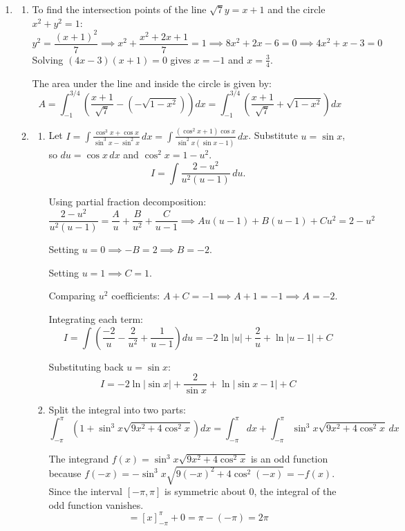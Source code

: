 \documentclass[a4paper, 12pt]{article}
\begin{document}
\begin{enumerate}[leftmargin=*,label=\textbf{\arabic*.}]
\item \begin{enumerate}[leftmargin=*,label=\textbf{\alph*.}]

\item To find the intersection points of the line $\sqrt{7}y = x+1$ and the circle $x^2 + y^2 = 1$:
\[y^2 = \frac{(x+1)^2}{7} \implies x^2 + \frac{x^2 + 2x + 1}{7} = 1 \implies 8x^2 + 2x - 6 = 0 \implies 4x^2 + x - 3 = 0\]
Solving $(4x-3)(x+1) = 0$ gives $x = -1$ and $x = \frac{3}{4}$.

The area under the line and inside the circle is given by:
\[A = \int_{-1}^{3/4} \left( \frac{x+1}{\sqrt{7}} - \left(-\sqrt{1-x^2}\right) \right) dx =\boxed{ \int_{-1}^{3/4} \left( \frac{x+1}{\sqrt{7}} + \sqrt{1-x^2} \right) dx}\]

\item \begin{enumerate}[leftmargin=*,label=\textbf{\roman*.}]
\item Let $I = \int \frac{\cos^3 x + \cos x}{\sin^3 x - \sin^2 x} \, dx = \int \frac{(\cos^2 x + 1)\cos x}{\sin^2 x (\sin x - 1)} \, dx$. Substitute $u = \sin x$, so \linebreak$du = \cos x \, dx$ and $\cos^2 x = 1 - u^2$.
\[I = \int \frac{2 - u^2}{u^2(u-1)} \, du.\]

Using partial fraction decomposition:
\[\frac{2 - u^2}{u^2(u-1)} = \frac{A}{u} + \frac{B}{u^2} + \frac{C}{u-1} \implies A u (u-1) + B(u-1) + C u^2 = 2 - u^2\]

Setting $u = 0 \implies -B = 2 \implies B = -2$.

Setting $u = 1 \implies C = 1$.

Comparing $u^2$ coefficients: $A + C = -1 \implies A + 1 = -1 \implies A = -2$.

Integrating each term:
\[I = \int \left( \frac{-2}{u} - \frac{2}{u^2} + \frac{1}{u-1} \right) du = -2\ln|u| + \frac{2}{u} + \ln|u-1| + C\]

Substituting back $u = \sin x$:
\[\boxed{I = -2\ln\left|\sin x\right| + \frac{2}{\sin x} + \ln\left|\sin x - 1\right| + C}\]

\item Split the integral into two parts:
\[\int_{-\pi}^{\pi} \left(1 + \sin^3 x \sqrt{9x^2 + 4\cos^2 x}\right) dx = \int_{-\pi}^{\pi} dx + \int_{-\pi}^{\pi} \sin^3 x \sqrt{9x^2 + 4\cos^2 x} \, dx\]

The integrand $f(x) = \sin^3 x \sqrt{9x^2 + 4\cos^2 x}$ is an odd function because \linebreak$f(-x) = -\sin^3 x \sqrt{9(-x)^2 + 4\cos^2(-x)} = -f(x)$. Since the interval $[-\pi, \pi]$ is symmetric about $0$, the integral of the odd function vanishes.
\[= [x]_{-\pi}^{\pi} + 0 = \pi - (-\pi) = \boxed{2\pi}\]


\end{enumerate}
\end{enumerate}
\end{enumerate}
\end{document}
